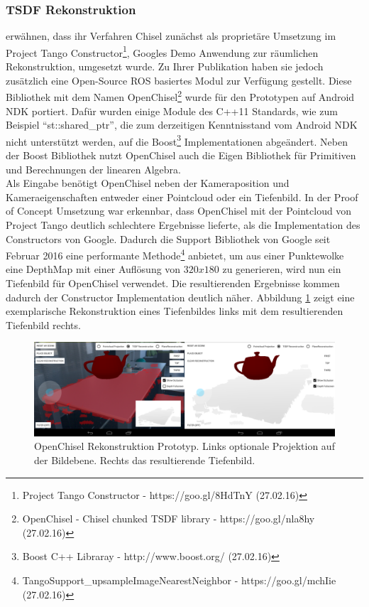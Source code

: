 \subsubsection*{TSDF Rekonstruktion}

\citet{Klingensmith_2015_7924} erwähnen, dass ihr Verfahren Chisel zunächst als proprietäre Umsetzung im Project Tango Constructor\footnote{Project Tango Constructor - https://goo.gl/8HdTnY (27.02.16)}, Googles Demo Anwendung zur räumlichen Rekonstruktion, umgesetzt wurde. Zu Ihrer Publikation haben sie jedoch zusätzlich eine Open-Source ROS basiertes Modul zur Verfügung gestellt. Diese Bibliothek mit dem Namen OpenChisel\footnote{OpenChisel - Chisel chunked TSDF library - https://goo.gl/nla8hy (27.02.16)} wurde für den Prototypen auf Android NDK portiert. Dafür wurden einige Module des C++11 Standards, wie zum Beispiel \enquote{st::shared\_ptr}, die zum derzeitigen Kenntnisstand vom Android NDK nicht unterstützt werden, auf die Boost\footnote{Boost C++ Libraray - http://www.boost.org/ (27.02.16)} Implementationen abgeändert. Neben der Boost Bibliothek nutzt OpenChisel auch die Eigen Bibliothek für Primitiven und Berechnungen der linearen Algebra.\\

Als Eingabe benötigt OpenChisel neben der Kameraposition und Kameraeigenschaften entweder einer Pointcloud oder ein Tiefenbild. In der Proof of Concept Umsetzung war erkennbar, dass OpenChisel mit der Pointcloud von Project Tango deutlich schlechtere Ergebnisse lieferte, als die Implementation des Constructors von Google. Dadurch die Support Bibliothek von Google seit Februar 2016 eine performante Methode\footnote{TangoSupport\_upsampleImageNearestNeighbor - https://goo.gl/mchIie (27.02.16)} anbietet, um aus einer Punktewolke eine DepthMap mit einer Auflösung von \(320x180 \) zu generieren, wird nun ein Tiefenbild für OpenChisel verwendet. Die resultierenden Ergebnisse kommen dadurch der Constructor Implementation deutlich näher. Abbildung \ref{fig:chisel-demo} zeigt eine exemplarische Rekonstruktion eines Tiefenbildes links mit dem resultierenden Tiefenbild rechts.

\begin{figure}[h]
  \centering
	\includegraphics[width=1.0\textwidth]{content/images/implementation/chisel-demo.png} 
  \caption{OpenChisel Rekonstruktion Prototyp. Links optionale Projektion auf der Bildebene. Rechts das resultierende Tiefenbild.}
  \label{fig:chisel-demo}
\end{figure}
